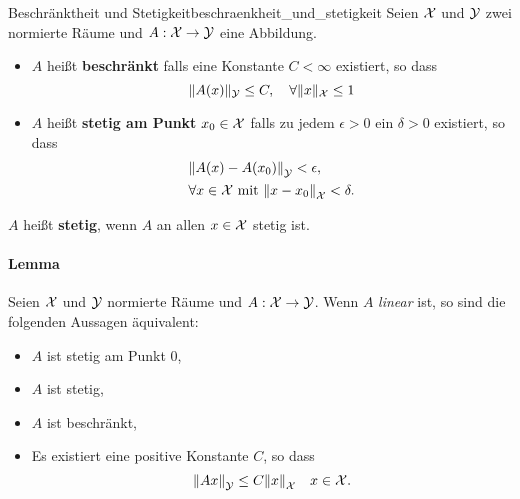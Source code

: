 \begin{boringDef}{Beschränktheit und Stetigkeit}{beschraenkheit_und_stetigkeit}
Seien $\mathcal{X}$ und $\mathcal{Y}$ zwei normierte Räume und $A: \mathcal{X} \to \mathcal{Y}$  eine Abbildung.
\begin{itemize}
  \item $A$ heißt \textbf{beschränkt} falls eine Konstante $C < \infty$ existiert, so dass
  \begin{equation*}
  \|A(x)\|_{\mathcal{Y}} \leq C, \quad \forall \|x\|_{\mathcal{X}} \leq 1
  \end{equation*}
  \item $A$ heißt \textbf{stetig am Punkt} $x_0 \in \mathcal{X}$ falls zu jedem $\epsilon > 0$ ein $\delta > 0$ existiert, so dass
  \begin{align*}
  &{\|A(x) - A(x_0)\|}_{\mathcal{Y}} < \epsilon,\\
  &\forall x \in \mathcal{X} \text{ mit } {\|x - x_0\|}_{\mathcal{X}} < \delta.
  \end{align*}
\end{itemize}
  $A$ heißt \textbf{stetig}, wenn $A$ an allen $x \in \mathcal{X}$ stetig ist.
\end{boringDef}

\paragraph{Lemma}
Seien $\mathcal{X}$ und $\mathcal{Y}$ normierte Räume und $A: \mathcal{X} \to \mathcal{Y}$.
Wenn $A$ \textit{linear} ist, so sind die folgenden Aussagen äquivalent:
\begin{itemize}
  \item $A$ ist stetig am Punkt $0$,
  \item $A$ ist stetig,
  \item $A$ ist beschränkt,
  \item Es existiert eine positive Konstante $C$, so dass
  \begin{equation*}
    {\|Ax\|}_{\mathcal{Y}} \leq C {\|x\|}_{\mathcal{X}} \quad x \in \mathcal{X}.
  \end{equation*}
\end{itemize}
